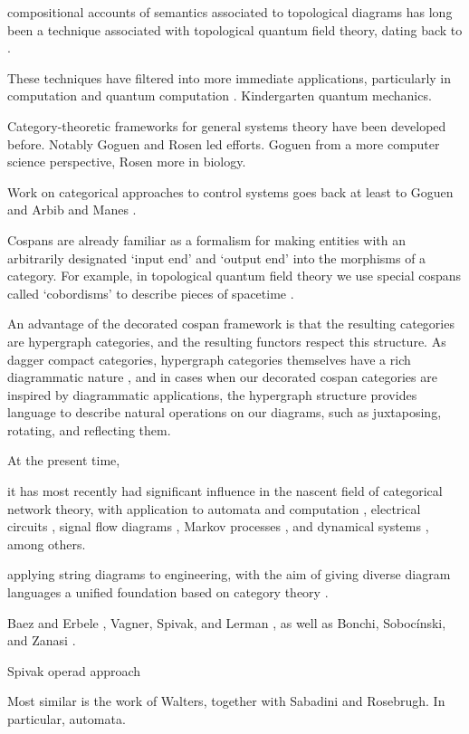   compositional accounts of semantics associated to topological
diagrams has long been a technique associated with topological
quantum field theory, dating back to \cite{At}.

These techniques have filtered into more immediate applications, particularly in
computation and quantum computation \cite{AC04,Ba1,Sel07}. 
Kindergarten quantum mechanics. 

Category-theoretic frameworks for general systems theory have been developed
before. Notably Goguen and Rosen led efforts. Goguen from a more computer
science perspective, Rosen more in biology.


Work on categorical approaches to control systems goes back at least to Goguen
\cite{Go} and Arbib and Manes \cite{AM}. 

Cospans are already familiar as a formalism for making entities with an
arbitrarily designated `input end' and `output end' into the morphisms of a
category.  For example, in topological quantum field theory we use special
cospans called `cobordisms' to describe pieces of spacetime \cite{BL,BaezStay}.

An advantage of the decorated cospan framework is that the resulting categories
are hypergraph categories, and the resulting functors respect this structure.
As dagger compact categories, hypergraph categories themselves have a rich
diagrammatic nature \cite{Sel11}, and in cases when our decorated cospan categories
are inspired by diagrammatic applications, the hypergraph structure provides
language to describe natural operations on our diagrams, such as juxtaposing,
rotating, and reflecting them.

At the present time, 

it has most recently had
significant influence in the nascent field of categorical network theory, with
application to automata and computation \cite{KSW2, Sp}, electrical circuits
\cite{BF}, signal flow diagrams \cite{BSZ, BE}, Markov processes \cite{BFP,
ASW}, and dynamical systems \cite{VSL}, among others. 

applying string diagrams to engineering, with the aim of
giving diverse diagram languages a unified foundation based on category theory
\cite{KSW,RSW05}. 

Baez and Erbele
\cite{BE}, Vagner, Spivak, and Lerman \cite{VSL}, as well as Bonchi,
Soboc\'inski, and Zanasi \cite{BSZ,BSZ2,BSZ3,Za}. 


Spivak operad approach

Most similar is the work of Walters, together with Sabadini and Rosebrugh. In
particular, automata.

